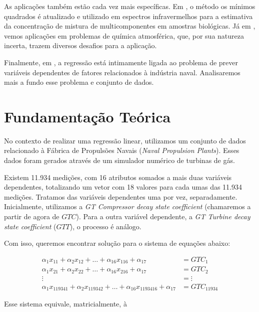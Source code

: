 \documentclass[a4paper, 12pt]{article}
\theoremstyle{definition}
\theoremstyle{remark}
\begin{document}
As aplicações também estão cada vez mais específicas. Em \cite{haaland1982}, o método os mínimos quadrados é atualizado e utilizado em espectros infravermelhos para a estimativa da concentração de mistura de multicomponentes em amostras biológicas. Já em \cite{cantrell2008}, vemos aplicações em problemas de química atmosférica, que, por sua natureza incerta, trazem diversos desafios para a aplicação.

Finalmente, em \cite{Coraddu2013Machine}, a regressão está intimamente ligada ao problema de prever variáveis dependentes de fatores relacionados à indústria naval. Analisaremos mais a fundo esse problema e conjunto de dados.



\newpage
\section{Fundamentação Teórica}
No contexto de realizar uma regressão linear, utilizamos um conjunto de dados relacionado à Fábrica de Propulsões Navais (\textit{Naval Propulsion Plants}). Esses dados foram gerados através de um simulador numérico de turbinas de gás. \cite{dataset}
    
Existem 11.934 medições, com 16 atributos somados a mais duas variáveis dependentes, totalizando um vetor com 18 valores para cada umas das 11.934 medições. Tratamos das variáveis dependentes uma por vez, separadamente. Inicialmente, utilizamos a \textit{GT Compressor decay state coefficient} (chamaremos a partir de agora de $GTC$). Para a outra variável dependente, a \textit{GT Turbine decay state coefficient} ($GTT$), o processo é análogo.
    
Com isso, queremos encontrar solução para o sistema de equações abaixo:
    
\begin{align*}
    \alpha_1 x_{11} + \alpha_2 x_{12} + \ldots + \alpha_{16} x_{116} + \alpha_{17} &= GTC_1\\
    \alpha_1 x_{21} + \alpha_2 x_{22} + \ldots + \alpha_{16} x_{216} + \alpha_{17} &= GTC_2\\
    \vdots &= \vdots\\
    \alpha_1 x_{119341} + \alpha_2 x_{119342} + \ldots + \alpha_{16} x_{1193416} + \alpha_{17} &= GTC_{11934}
\end{align*}

Esse sistema equivale, matricialmente, à
\end{document}
